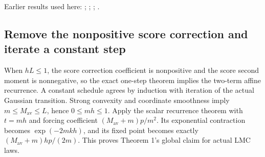 \documentclass[11pt,a4paper]{report}
\begin{document}
Earlier results used here: \cite[Section~3.17.3]{LangevinLean2026ULASC}; \cite[Section~3.26.3]{LangevinLean2026ULASC}; \cite[Section~3.36.7]{LangevinLean2026ULASC}; \cite[Section~3.45.6]{LangevinLean2026ULASC}.
\subsection{\texorpdfstring{Remove the nonpositive score correction and iterate a constant step}{Remove the nonpositive score correction and iterate a constant step}}
\label{report-step-AverageLMC-Theorem-lean-2}


When \(hL\le1\), the score correction coefficient is nonpositive and the score second moment is nonnegative, so the exact one-step theorem implies the two-term affine recurrence. A constant schedule agrees by induction with iteration of the actual Gaussian transition. Strong convexity and coordinate smoothness imply \(m\le M_{\mathrm{av}}\le L\), hence \(0\le mh\le 1\). Apply the scalar recurrence theorem with \(t=mh\) and forcing coefficient \((M_{\mathrm{av}}+m)p/m^2\). Its exponential contraction becomes \(\exp(-2mkh)\), and its fixed point becomes exactly \((M_{\mathrm{av}}+m)hp/(2m)\). This proves Theorem 1’s global claim for actual LMC laws.
\end{document}
